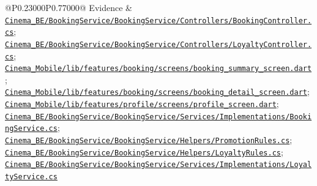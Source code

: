 \begin{longtable}{@{}P{0.23000\SRSWidth}P{0.77000\SRSWidth}@{}}
Evidence & \href{../../../Cinema\_BE/BookingService/BookingService/Controllers/BookingController.cs}{\texttt{Cinema\_\allowbreak{}BE/\allowbreak{}Booking\allowbreak{}Service/\allowbreak{}Booking\allowbreak{}Service/\allowbreak{}Controll\allowbreak{}ers/\allowbreak{}Booking\allowbreak{}Controll\allowbreak{}er.\allowbreak{}cs}}; \href{../../../Cinema\_BE/BookingService/BookingService/Controllers/LoyaltyController.cs}{\texttt{Cinema\_\allowbreak{}BE/\allowbreak{}Booking\allowbreak{}Service/\allowbreak{}Booking\allowbreak{}Service/\allowbreak{}Controll\allowbreak{}ers/\allowbreak{}Loyalty\allowbreak{}Controll\allowbreak{}er.\allowbreak{}cs}}; \href{../../../Cinema\_Mobile/lib/features/booking/screens/booking\_summary\_screen.dart}{\texttt{Cinema\_\allowbreak{}Mobile/\allowbreak{}lib/\allowbreak{}features\allowbreak{}/\allowbreak{}booking/\allowbreak{}screens/\allowbreak{}booking\_\allowbreak{}summary\_\allowbreak{}screen.\allowbreak{}dart}}; \href{../../../Cinema\_Mobile/lib/features/booking/screens/booking\_detail\_screen.dart}{\texttt{Cinema\_\allowbreak{}Mobile/\allowbreak{}lib/\allowbreak{}features\allowbreak{}/\allowbreak{}booking/\allowbreak{}screens/\allowbreak{}booking\_\allowbreak{}detail\_\allowbreak{}screen.\allowbreak{}dart}}; \href{../../../Cinema\_Mobile/lib/features/profile/screens/profile\_screen.dart}{\texttt{Cinema\_\allowbreak{}Mobile/\allowbreak{}lib/\allowbreak{}features\allowbreak{}/\allowbreak{}profile/\allowbreak{}screens/\allowbreak{}profile\_\allowbreak{}screen.\allowbreak{}dart}}; \href{../../../Cinema\_BE/BookingService/BookingService/Services/Implementations/BookingService.cs}{\texttt{Cinema\_\allowbreak{}BE/\allowbreak{}Booking\allowbreak{}Service/\allowbreak{}Booking\allowbreak{}Service/\allowbreak{}Services\allowbreak{}/\allowbreak{}Implemen\allowbreak{}tations/\allowbreak{}Booking\allowbreak{}Service.\allowbreak{}cs}}; \href{../../../Cinema\_BE/BookingService/BookingService/Helpers/PromotionRules.cs}{\texttt{Cinema\_\allowbreak{}BE/\allowbreak{}Booking\allowbreak{}Service/\allowbreak{}Booking\allowbreak{}Service/\allowbreak{}Helpers/\allowbreak{}Promotio\allowbreak{}n\allowbreak{}Rules.\allowbreak{}cs}}; \href{../../../Cinema\_BE/BookingService/BookingService/Helpers/LoyaltyRules.cs}{\texttt{Cinema\_\allowbreak{}BE/\allowbreak{}Booking\allowbreak{}Service/\allowbreak{}Booking\allowbreak{}Service/\allowbreak{}Helpers/\allowbreak{}Loyalty\allowbreak{}Rules.\allowbreak{}cs}}; \href{../../../Cinema\_BE/BookingService/BookingService/Services/Implementations/LoyaltyService.cs}{\texttt{Cinema\_\allowbreak{}BE/\allowbreak{}Booking\allowbreak{}Service/\allowbreak{}Booking\allowbreak{}Service/\allowbreak{}Services\allowbreak{}/\allowbreak{}Implemen\allowbreak{}tations/\allowbreak{}Loyalty\allowbreak{}Service.\allowbreak{}cs}} \\[3pt]

\end{longtable}
